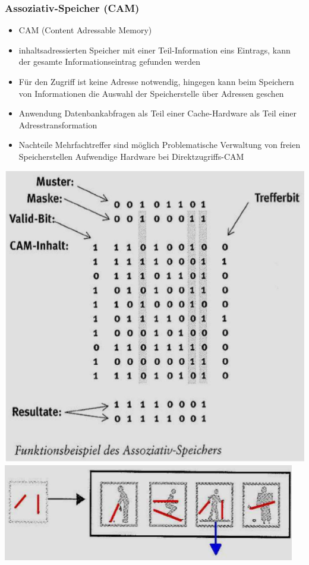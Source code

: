 \subsubsection{Assoziativ-Speicher (CAM)}
\begin{minipage}{0.7\linewidth}
    \begin{itemize}
        \item CAM (Content Adressable Memory)
        \item inhaltsadressierten Speicher
        \subitem mit einer Teil-Information eins Eintrags, kann der gesamte Informationseintrag gefunden werden
        \item Für den Zugriff ist keine Adresse notwendig, hingegen kann beim Speichern von Informationen die Auswahl der Speicherstelle über Adressen geschen
        \item Anwendung
        \subitem Datenbankabfragen
        \subitem als Teil einer Cache-Hardware
        \subitem als Teil einer Adresstransformation
        \item Nachteile
        \subitem Mehrfachtreffer sind möglich
        \subitem Problematische Verwaltung von freien Speicherstellen
        \subitem Aufwendige Hardware bei Direktzugriffs-CAM
    \end{itemize}
\end{minipage}
\begin{minipage}{0.3\linewidth}
    \includegraphics[width=\textwidth]{images/SystembusSpeicherSpeichersystem/SpeicherSysCAM}
    \includegraphics[width=\textwidth]{images/SystembusSpeicherSpeichersystem/SpeicherSysCAM1}
\end{minipage}
